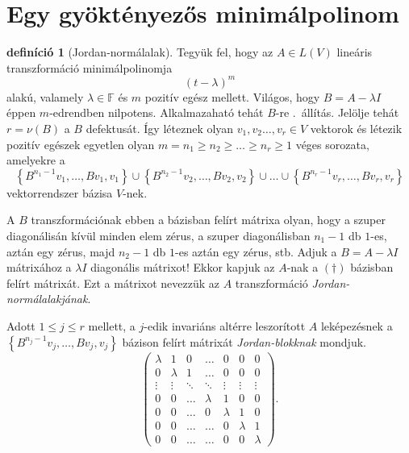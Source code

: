 \documentclass[9pt, a4paper, showtrims]{memoir}
\theoremstyle{plain}
\theoremstyle{remark}
\theoremstyle{definition}
\newtheorem{definition}[proposition]{definíció}
\begin{document}
\section{Egy gyöktényezős minimálpolinom}
\begin{definition}[Jordan-normálalak]
	Tegyük fel, hogy az $A\in L\left( V \right)$ lineáris transzformáció
	minimálpolinomja
	\[
		\left( t-\lambda \right)^m
	\]
	alakú, valamely $\lambda\in\mathbb{F}$ és $m$ pozitív egész mellett.
	Világos, hogy $B=A-\lambda I$ éppen $m$-edrendben nilpotens.
	Alkalmazaható tehát $B$-re .~állítás.
	Jelölje tehát $r=\nu\left( B \right)$ a $B$ defektusát.
	Így léteznek olyan $v_1,v_2\dots,v_r\in V$ vektorok és
	létezik pozitív egészek egyetlen olyan $m=n_1\geq n_2\geq \dots\geq n_r\geq 1$ véges sorozata,
	amelyekre a
	\[
		\left\{ B^{n_1-1}v_1,\ldots,Bv_1,v_1 \right\}
		\cup
		\left\{ B^{n_2-1}v_2,\ldots,Bv_2,v_2 \right\}
		\cup
		\ldots
		\cup
		\left\{ B^{n_r-1}v_r,\ldots,Bv_r,v_r \right\}
		\tag{\dag}
	\]
	vektorrendszer bázisa $V$-nek.

	A $B$ transzformációnak ebben a bázisban felírt mátrixa olyan, hogy
	a szuper diagonálisán kívül minden elem zérus,
	a szuper diagonálisban $n_1-1$ db $1$-es, aztán egy zérus, majd $n_2-1$ db $1$-es aztán egy zérus, stb.
	Adjuk a $B=A-\lambda I$ mátrixához a $\lambda I$ diagonális mátrixot!
	Ekkor kapjuk az $A$-nak a $(\dag)$ bázisban felírt mátrixát.
	Ezt a mátrixot nevezzük az $A$ transzformáció \emph{Jordan-normálalakjának}.
\end{definition}
Adott $1\leq j\leq r$ mellett,
a $j$-edik invariáns altérre leszorított $A$ leképezésnek a
\begin{math}
	\left\{ B^{n_j-1}v_j,\ldots,Bv_j,v_j \right\}
\end{math}
bázison felírt mátrixát \emph{Jordan-blokknak} mondjuk.
\[
	\begin{pmatrix}
		\lambda & 1       & 0      & \dots   & 0       & 0       & 0       \\
		0       & \lambda & 1      & \dots   & 0       & 0       & 0       \\
		\vdots  & \vdots  & \ddots & \ddots  & \vdots  & \vdots  & \vdots  \\
		0       & 0       & \dots  & \lambda & 1       & 0       & 0       \\
		0       & 0       & \dots  & 0       & \lambda & 1       & 0       \\
		0       & 0       & \dots  & \dots   & 0       & \lambda & 1       \\
		0       & 0       & \dots  & \dots   & 0       & 0       & \lambda
	\end{pmatrix}.
\]
\end{document}
